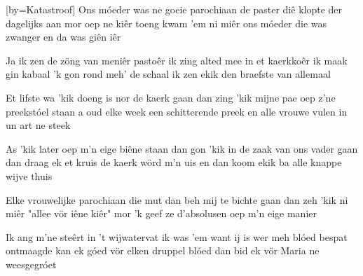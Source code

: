 [by={Katastroof}]
\beginverse
Ons m\'oeder was ne goeie parochiaan
de paster di\^e klopte der dagelijks aan
mor oep ne ki\^er
toeng kwam 'em ni mi\^er
ons m\'oeder die was zwanger en da was gi\^en i\^er
\endverse

\beginchorus
Ja ik zen de z\"ong van meni\^er pasto\^er
ik zing alted mee in et kaerkko\^er
ik maak gin kabaal
'k gon rond meh' de schaal
ik zen ekik den braefste van allemaal
\endchorus

\beginverse
Et lifste wa 'kik doeng is nor de kaerk gaan
dan zing 'kik mijne pae oep z'ne preekst\'oel staan
a oud elke week
een schitterende preek
en alle vrouwe vulen in un art ne steek
\endverse

\beginverse
As 'kik later oep m'n eige bi\^ene staan
dan gon 'kik in de zaak van ons vader gaan
dan draag ek et kruis
de kaerk w\"ord m'n uis
en dan koom ekik ba alle knappe wijve thuis
\endverse

\beginverse
Elke vrouwelijke parochiaan
die mut dan beh mij te bichte gaan
dan zeh 'kik ni mi\^er
"allee v\"or i\^ene ki\^er"
mor 'k geef ze d'absolusen oep m'n eige manier
\endverse

\beginverse
Ik ang m'ne ste\^ert in 't wijwatervat
ik was 'em want ij is wer meh bl\'oed bespat
ontmaagde kan ek g\'oed
v\"or elken druppel bl\'oed
dan bid ek v\"or Maria ne weesgegr\'oet
\endverse
\endsong
